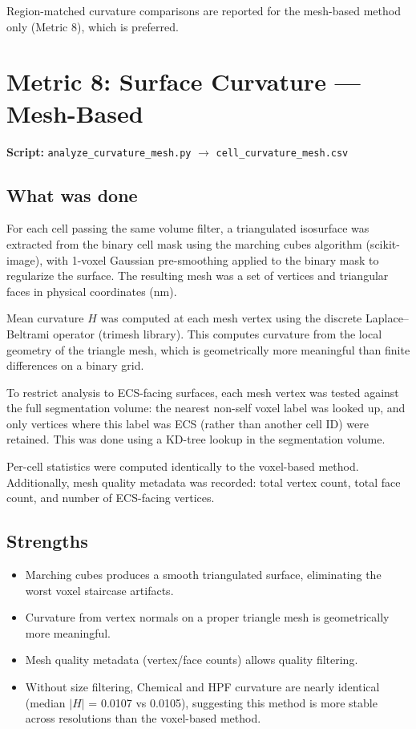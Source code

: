 \documentclass[times, twoside]{zHenriquesLab-StyleBioRxiv}
\begin{document}
Region-matched curvature comparisons are reported for the mesh-based method only (Metric 8), which is preferred.

\section*{Metric 8: Surface Curvature --- Mesh-Based}

{\small\textbf{Script:} \texttt{analyze\_curvature\_mesh.py}
$\rightarrow$ \texttt{cell\_curvature\_mesh.csv}}

\subsection*{What was done}
For each cell passing the same volume filter, a triangulated isosurface was extracted from the binary cell mask using the marching cubes algorithm (scikit-image), with 1-voxel Gaussian pre-smoothing applied to the binary mask to regularize the surface. The resulting mesh was a set of vertices and triangular faces in physical coordinates (nm).

Mean curvature $H$ was computed at each mesh vertex using the discrete Laplace--Beltrami operator (trimesh library). This computes curvature from the local geometry of the triangle mesh, which is geometrically more meaningful than finite differences on a binary grid.

To restrict analysis to ECS-facing surfaces, each mesh vertex was tested against the full segmentation volume: the nearest non-self voxel label was looked up, and only vertices where this label was ECS (rather than another cell ID) were retained. This was done using a KD-tree lookup in the segmentation volume.

Per-cell statistics were computed identically to the voxel-based method. Additionally, mesh quality metadata was recorded: total vertex count, total face count, and number of ECS-facing vertices.

\subsection*{Strengths}
\begin{itemize}[nosep]
\item Marching cubes produces a smooth triangulated surface, eliminating the worst voxel staircase artifacts.
\item Curvature from vertex normals on a proper triangle mesh is geometrically more meaningful.
\item Mesh quality metadata (vertex/face counts) allows quality filtering.
\item Without size filtering, Chemical and HPF curvature are nearly identical (median $|H|$ = 0.0107 vs 0.0105), suggesting this method is more stable across resolutions than the voxel-based method.
\end{itemize}
\end{document}
